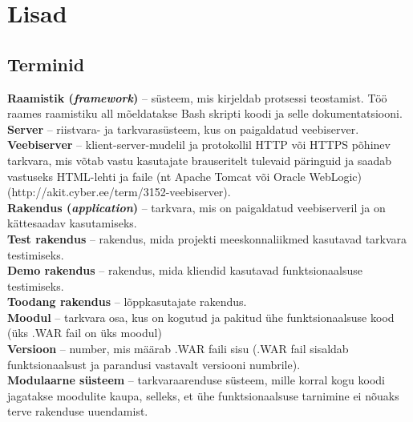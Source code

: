 \documentclass[12pt]{report}
\begin{document}
  \newpage
  
  \section*{Lisad}
  \label{lisad}
  
  \subsection{Terminid}
  
  \textbf{Raamistik (\textit{framework})} \--- süsteem, mis kirjeldab protsessi teostamist. Töö raames raamistiku all mõeldatakse Bash skripti koodi ja selle dokumentatsiooni.\\
  
  \textbf{Server} \--- riistvara- ja tarkvarasüsteem, kus on paigaldatud veebiserver.\\
  
  \textbf{Veebiserver} \--- klient-server-mudelil ja protokollil HTTP või HTTPS põhinev tarkvara, mis võtab vastu kasutajate brauseritelt tulevaid päringuid ja saadab vastuseks HTML-lehti ja faile (nt Apache Tomcat või Oracle WebLogic) (http://akit.cyber.ee/term/3152-veebiserver).\\
  
  \textbf{Rakendus (\textit{application})} \--- tarkvara, mis on paigaldatud veebiserveril ja on kättesaadav kasutamiseks.\\
  
  \textbf{Test rakendus} \--- rakendus, mida projekti meeskonnaliikmed kasutavad tarkvara testimiseks.\\
  
  \textbf{Demo rakendus} \--- rakendus, mida kliendid kasutavad funktsionaalsuse testimiseks.\\
  
  \textbf{Toodang rakendus} \--- lõppkasutajate rakendus.\\
  
  \textbf{Moodul} \--- tarkvara osa, kus on kogutud ja pakitud ühe funktsionaalsuse kood (üks .WAR fail on üks moodul)\\
  
  \textbf{Versioon} \--- number, mis määrab .WAR faili sisu (.WAR fail sisaldab funktsionaalsust ja parandusi vastavalt versiooni numbrile).\\
  
  \textbf{Modulaarne süsteem} \--- tarkvaraarenduse süsteem, mille korral kogu koodi jagatakse moodulite kaupa, selleks, et ühe funktsionaalsuse tarnimine ei nõuaks terve rakenduse uuendamist.\\
  
\end{document}
